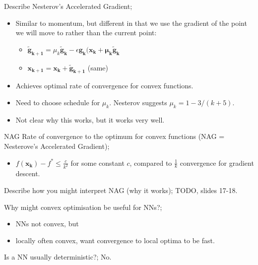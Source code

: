 \documentclass{article}
\begin{document}
Describe Nesterov's Accelerated Gradient; \begin{itemize}
	\item Similar to momentum, but different in that we use the gradient of the point we will move to rather than the current point:
		\begin{itemize}
			\item $\mathbf{\tilde{g}_{k+1}}=\mu_k\mathbf{\tilde{g}_k}-\epsilon \mathbf{g_k(x_k+\mu_k\tilde{{g}}_k}$
				\item $\mathbf{x_{k+1}=x_k+\tilde{g}_{k+1}}$ (same)
			\end{itemize}
		\item Achieves optimal rate of convergence for convex functions.
		\item Need to choose schedule for $\mu_k$. Nesterov suggests $\mu_k = 1 - 3/(k+5)$.
		\item Not clear why this works, but it works very well.
	\end{itemize}


NAG Rate of convergence to the optimum for convex functions (NAG = Nesterove's Accelerated Gradient); \begin{itemize}
	\item $f(\mathbf{x_k})-f^*\leq \frac{c}{k^2}$ for some constant $c$, compared to $\frac{1}{k}$ convergence for gradient descent.
\end{itemize}

Describe how you might interpret NAG (why it works); TODO, slides 17-18.

Why might convex optimisation be useful for NNs?; \begin{itemize}
	\item NNs not convex, but
	\item locally often convex, want convergence to local optima to be fast.
\end{itemize}

Is a NN usually deterministic?; No.
\end{document}
